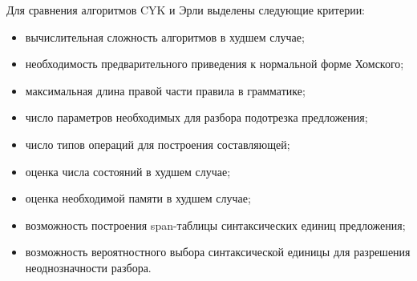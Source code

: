 Для сравнения алгоритмов CYK и Эрли выделены следующие критерии:
\begin{itemize}
	\item вычислительная сложность алгоритмов в худшем случае;
	\item необходимость предварительного приведения к нормальной форме Хомского;
	\item максимальная длина правой части правила в грамматике;
	\item число параметров необходимых для разбора подотрезка предложения;
	\item число типов операций для построения составляющей;
	\item оценка числа состояний в худшем случае;
	\item оценка необходимой памяти в худшем случае;
	\item возможность построения span-таблицы синтаксических единиц предложения;
	\item возможность вероятностного выбора синтаксической единицы для разрешения неоднозначности разбора.
\end{itemize}

